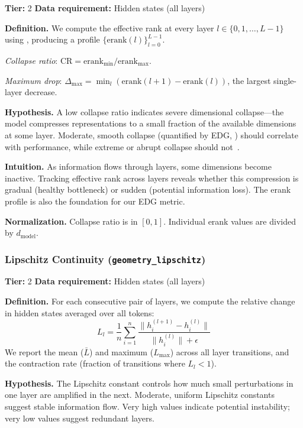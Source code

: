 \documentclass{article}
\begin{document}
\textbf{Tier:} 2 \quad \textbf{Data requirement:} Hidden states (all layers)

\textbf{Definition.}
We compute the effective rank at every layer $l \in \{0, 1, \ldots, L-1\}$ using , producing a profile $\{\text{erank}(l)\}_{l=0}^{L-1}$.

\emph{Collapse ratio}: $\text{CR} = \text{erank}_{\min} / \text{erank}_{\max}$.

\emph{Maximum drop}: $\Delta_{\max} = \min_l (\text{erank}(l+1) - \text{erank}(l))$, the largest single-layer decrease.

\textbf{Hypothesis.}
A low collapse ratio indicates severe dimensional collapse---the model compresses representations to a small fraction of the available dimensions at some layer. Moderate, smooth collapse (quantified by EDG, ) should correlate with performance, while extreme or abrupt collapse should not~\citep{jing2021understanding}.

\textbf{Intuition.}
As information flows through layers, some dimensions become inactive. Tracking effective rank across layers reveals whether this compression is gradual (healthy bottleneck) or sudden (potential information loss). The erank profile is also the foundation for our EDG metric.

\textbf{Normalization.} Collapse ratio is in $[0, 1]$. Individual erank values are divided by $d_{\text{model}}$.

\subsubsection{Lipschitz Continuity (\texttt{geometry\_lipschitz})}
\label{app:lipschitz}

\textbf{Tier:} 2 \quad \textbf{Data requirement:} Hidden states (all layers)

\textbf{Definition.}
For each consecutive pair of layers, we compute the relative change in hidden states averaged over all tokens:
\begin{equation}
  L_l = \frac{1}{n}\sum_{i=1}^{n} \frac{\|h_i^{(l+1)} - h_i^{(l)}\|}{\|h_i^{(l)}\| + \epsilon}
\end{equation}
We report the mean ($\bar{L}$) and maximum ($L_{\max}$) across all layer transitions, and the contraction rate (fraction of transitions where $L_l < 1$).

\textbf{Hypothesis.}
The Lipschitz constant controls how much small perturbations in one layer are amplified in the next. Moderate, uniform Lipschitz constants suggest stable information flow. Very high values indicate potential instability; very low values suggest redundant layers.
\end{document}
